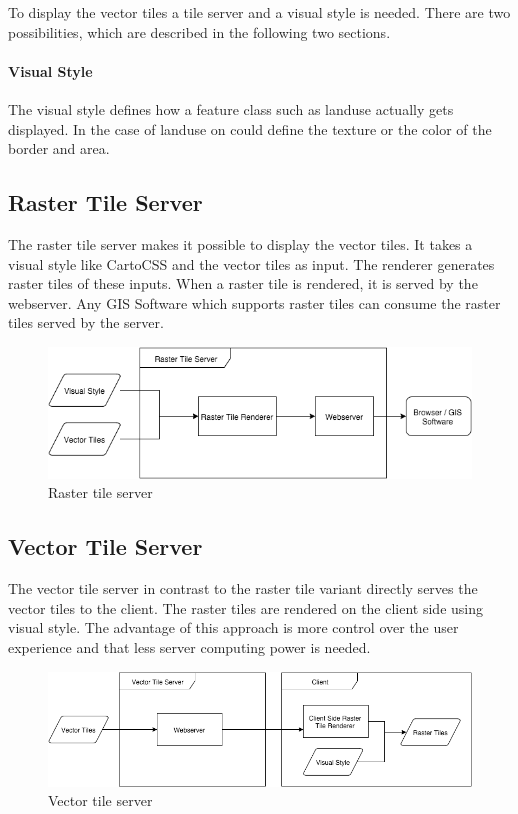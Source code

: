 To display the vector tiles a tile server and a visual style is needed. There are two possibilities, which are described in the following two sections.

\paragraph{Visual Style}
The visual style defines how a feature class such as landuse actually gets displayed. In the case of landuse on could define the texture or the color of the border and area.


\subsection{Raster Tile Server}

The raster tile server makes it possible to display the vector tiles. It takes a visual style like CartoCSS\cite{3_github_2014} and the vector tiles as input. The renderer generates raster tiles of these inputs. When a raster tile is rendered, it is served by the webserver. Any GIS Software which supports raster tiles can consume the raster tiles served by the server.

\begin{figure}[H]

  \centering
  \includegraphics[width=1\textwidth]{images/raster_tile_server.png}
  \caption{Raster tile server}
\end{figure}

\subsection{Vector Tile Server}

The vector tile server in contrast to the raster tile variant directly serves the vector tiles to the client. The raster tiles are rendered on the client side using visual style. The advantage of this approach is more control over the user experience and that less server computing power is needed.

\begin{figure}[H]

  \centering
  \includegraphics[width=1\textwidth]{images/vector_tile_server.png}
  \caption{Vector tile server}
\end{figure}

\newpage